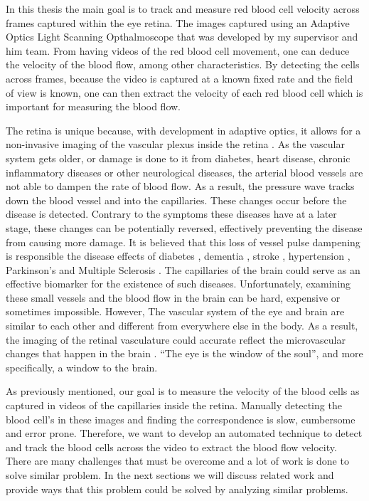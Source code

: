 \documentclass[]{article}
\begin{document}
In this thesis the main goal is to track and measure red blood cell velocity across frames captured within the eye retina.	
The images captured using an Adaptive Optics Light Scanning Opthalmoscope that was developed by my supervisor and him team.
From having videos of the red blood cell movement, one can deduce the velocity of the blood flow, among other characteristics.
By detecting the cells across frames, because the video is captured at a known fixed rate and the field of view is known, one can then extract the velocity of each red blood cell which is important for measuring the blood flow.

The retina is unique because, with development in adaptive optics, it allows for a non-invasive imaging of the vascular plexus inside the retina \cite{tam_noninvasive_2010}.
As the vascular system gets older, or damage is done to it from diabetes, heart disease, chronic inflammatory diseases or other neurological diseases, the arterial blood vessels are not able to dampen the rate of blood flow. As a result, the pressure wave tracks down the blood vessel and into the capillaries. 
These changes occur before the disease is detected. 
Contrary to the symptoms these diseases have at a later stage, these changes can be potentially reversed, effectively preventing the disease from causing more damage.  
It is believed that this loss of vessel pulse dampening is responsible the disease effects of diabetes \cite{mizutani_accelerated_diabetes_1996}, dementia \cite{de_la_torre_is_alzheimer_2004}, stroke \cite{ostergaard_role_stroke_2013}, hypertension \cite{wolf_s_quantification_hypertension_1994}, Parkinson's and Multiple Sclerosis \cite{bateman_comparison_multiple_sclerosis_2016}.
The capillaries of the brain could serve as an effective biomarker for the existence of such diseases.
Unfortunately, examining these small vessels and the blood flow in the brain can be hard, expensive or sometimes impossible.
However, The vascular system of the eye and brain are similar to each other and different from everywhere else in the body.
As a result, the imaging of the retinal vasculature could accurate reflect the microvascular changes that happen in the brain \cite{patton_retinal_brain_vasculature_similarity_2005}. ``The eye is the window of the soul'', and more specifically, a window to the brain.

As previously mentioned, our goal is to measure the velocity of the blood cells as captured in videos of the capillaries inside the retina.
Manually detecting the blood cell's in these images and finding the correspondence is slow, cumbersome and error prone.
Therefore, we want to develop an automated technique to detect and track the blood cells across the video to extract the blood flow velocity.
There are many challenges that must be overcome and a lot of work is done to solve similar problem.
In the next sections we will discuss related work and provide ways that this problem could be solved by analyzing similar problems.
\end{document}
